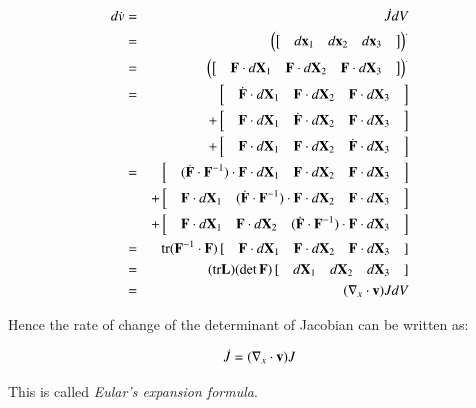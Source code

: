 \begin{eqnarray}
d\dot{v}  
&=&\dot{J}dV\\ 
&=&{\Big(\big[\quad d{\mathbf{x}_1} \quad d{\mathbf{x}_2} \quad d{\mathbf{x}_3} \quad \big]\Big)}^{.}\\  										
&=&{\Big(\big[\quad {\mathbf{F}} \cdot d{\mathbf{X}_1} \quad {\mathbf{F}} \cdot d{\mathbf{X}_2} \quad {\mathbf{F}} \cdot d{\mathbf{X}_3} \quad \big]\Big)}^{.}\\  				
&=&\left[ \quad \dot{\mathbf{F}} \cdot d{\mathbf{X}_1} \quad {\mathbf{F}} \cdot d{\mathbf{X}_2} \quad {\mathbf{F}} \cdot d{\mathbf{X}_3} \quad \right] \\
\quad && + \left[ \quad {\mathbf{F}} \cdot d{\mathbf{X}_1} \quad \dot{\mathbf{F}} \cdot d{\mathbf{X}_2} \quad {\mathbf{F}} \cdot d{\mathbf{X}_3} \quad \right]\\
\quad && + \left[\quad {\mathbf{F}} \cdot d{\mathbf{X}_1} \quad {\mathbf{F}} \cdot d{\mathbf{X}_2} \quad \dot{\mathbf{F}} \cdot d{\mathbf{X}_3} \quad \right]\\ 
&=&\left[\quad ( \dot{\mathbf{F}} \cdot {\mathbf{F}^{-1}} ) \cdot {\mathbf{F}} \cdot d{\mathbf{X}_1} \quad {\mathbf{F}} \cdot d{\mathbf{X}_2} \quad {\mathbf{F}} \cdot d{\mathbf{X}_3} \quad \right]\\
\quad &&+ \left[ \quad {\mathbf{F}} \cdot d{\mathbf{X}_1} \quad ( \dot{\mathbf{F}} \cdot {\mathbf{F}^{-1}} ) \cdot {\mathbf{F}} \cdot d{\mathbf{X}_2} \quad {\mathbf{F}} \cdot d{\mathbf{X}_3} \quad \right]\\ 
\quad && + \left[ \quad {\mathbf{F}} \cdot d{\mathbf{X}_1} \quad {\mathbf{F}} \cdot d{\mathbf{X}_2} \quad ( \dot{\mathbf{F}} \cdot {\mathbf{F}^{-1}} ) \cdot {\mathbf{F}} \cdot d{\mathbf{X}_3} \quad \right]\\ 
&=&{\rm tr}({\mathbf{F}^{-1}} \cdot {\mathbf{F}} ) \left[ \quad {\mathbf{F}} \cdot d{\mathbf{X}_1} \quad {\mathbf{F}} \cdot d{\mathbf{X}_2} \quad {\mathbf{F}} \cdot d{\mathbf{X}_3} \quad \right]\\		
&=&	({\rm tr}{\mathbf{L}})(\det{\mathbf{F}})\left[ \quad d{\mathbf{X}_1} \quad d{\mathbf{X}_2} \quad d{\mathbf{X}_3}\quad \right]\\
&=&(\nabla_x \cdot {\mathbf{v}})JdV
\end{eqnarray}

Hence the rate of change of the determinant of Jacobian can be written as:
\begin{tcolorbox}[title=Euler's expansion formula]
\begin{equation}
\label{eqn:eulers_expansion_formula}
\dot{J} = ( \nabla_x \cdot {\mathbf{v}})J 
\end{equation}
\end{tcolorbox}
%
This is called \emph{Eular's expansion formula}.



